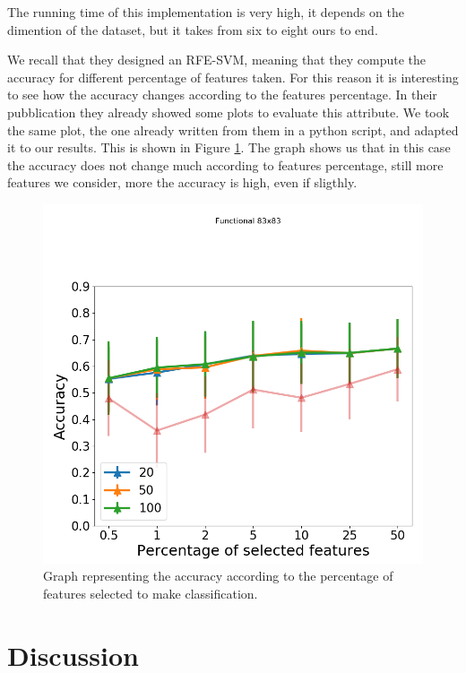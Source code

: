 The running time of this implementation is very high, it depends on the dimention of the dataset, but it takes from six to eight ours to end.
\vspace{0.5cm}

We recall that they designed an RFE-SVM, meaning that they compute the accuracy for different percentage of features taken. For this reason it is interesting to see how the accuracy changes according to the features percentage. In their pubblication they already showed some plots to evaluate this attribute. We took the same plot, the one already written from them in a python script, and adapted it to our results. This is shown in Figure \ref{fig:diagram20}. The graph shows us that in this case the accuracy does not change much according to features percentage, still more features we consider, more the accuracy is high, even if sligthly. 

\begin{figure}[htbp]
	\centering
	\includegraphics[scale=0.5]{Immagini/fc_83_schizo.png}
	\caption{Graph representing the accuracy according to the percentage of features selected to make classification.}
	\label{fig:diagram20}
\end{figure}


\section{Discussion}

